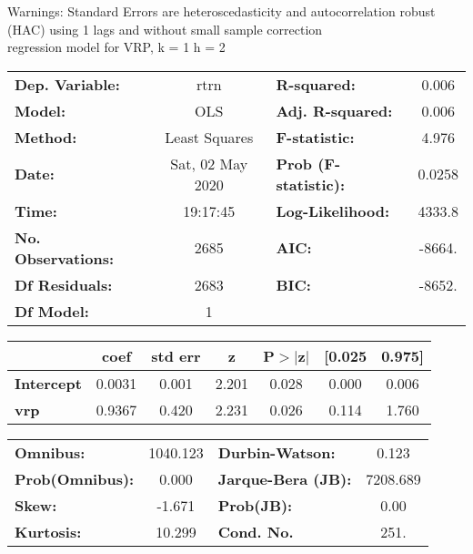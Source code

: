 Warnings: \newline
 [1] Standard Errors are heteroscedasticity and autocorrelation robust (HAC) using 1 lags and without small sample correction\\ 

regression model for VRP, k = 1 h = 2\begin{center}
\begin{tabular}{lclc}
\toprule
\textbf{Dep. Variable:}    &       rtrn       & \textbf{  R-squared:         } &     0.006   \\
\textbf{Model:}            &       OLS        & \textbf{  Adj. R-squared:    } &     0.006   \\
\textbf{Method:}           &  Least Squares   & \textbf{  F-statistic:       } &     4.976   \\
\textbf{Date:}             & Sat, 02 May 2020 & \textbf{  Prob (F-statistic):} &   0.0258    \\
\textbf{Time:}             &     19:17:45     & \textbf{  Log-Likelihood:    } &    4333.8   \\
\textbf{No. Observations:} &        2685      & \textbf{  AIC:               } &    -8664.   \\
\textbf{Df Residuals:}     &        2683      & \textbf{  BIC:               } &    -8652.   \\
\textbf{Df Model:}         &           1      & \textbf{                     } &             \\
\bottomrule
\end{tabular}
\begin{tabular}{lcccccc}
                   & \textbf{coef} & \textbf{std err} & \textbf{z} & \textbf{P$> |$z$|$} & \textbf{[0.025} & \textbf{0.975]}  \\
\midrule
\textbf{Intercept} &       0.0031  &        0.001     &     2.201  &         0.028        &        0.000    &        0.006     \\
\textbf{vrp}       &       0.9367  &        0.420     &     2.231  &         0.026        &        0.114    &        1.760     \\
\bottomrule
\end{tabular}
\begin{tabular}{lclc}
\textbf{Omnibus:}       & 1040.123 & \textbf{  Durbin-Watson:     } &    0.123  \\
\textbf{Prob(Omnibus):} &   0.000  & \textbf{  Jarque-Bera (JB):  } & 7208.689  \\
\textbf{Skew:}          &  -1.671  & \textbf{  Prob(JB):          } &     0.00  \\
\textbf{Kurtosis:}      &  10.299  & \textbf{  Cond. No.          } &     251.  \\
\bottomrule
\end{tabular}
\end{center}


